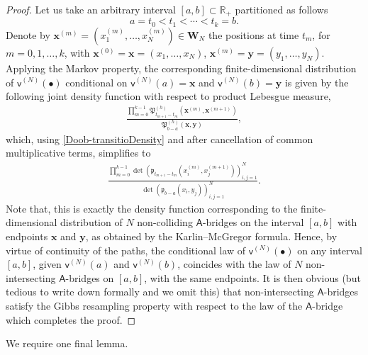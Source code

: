\documentclass[]{article}
\begin{document}
\begin{proof}
    Let us take an arbitrary
    interval $[a,b]\subset\mathbb{R}_+$ partitioned as follows
\begin{equation*}
   a= t_0< t_1< \cdots< t_k= b.
\end{equation*}
Denote by $\mathbf{x}^{(m)} = (x_1^{(m)}, \dots, x_N^{(m)})\in\mathbf{W}_{N}$ the positions
at time $t_m$, for $m=0, 1, \dots,k$,
with
$\mathbf{x}^{(0)} = \mathbf{x}=
\left(x_1, \dots, x_N\right)$, $\mathbf{x}^{(m)} = \mathbf{y}
=\left(y_1, \dots, y_N\right)$. Applying the Markov property, the corresponding finite-dimensional distribution of 
$\mathsf{v}^{(N)}(\bullet)$ conditional on $\mathsf{v}^{(N)}(a)=\mathbf{x}$ and $\mathsf{v}^{(N)}(b)=\mathbf{y}$
is given by the following joint density function with respect to product Lebesgue measure,
\begin{align*}
\frac{
\prod_{m=0}^{k-1} \mathfrak{P}^{(h)}_{t_{m+1} - t_m}\left(\mathbf{x}^{(m)}, \mathbf{x}^{(m+1)}\right)
}{
\mathfrak{P}^{(h)}_{b-a}\left(\mathbf{x}, \mathbf{y}\right)
}, 
\end{align*}
which, using \eqref{Doob-transitioDensity} and after  cancellation of common multiplicative terms, simplifies to
\begin{align}
\frac{
\prod_{m=0}^{k-1} \det\left(\mathfrak{p}_{t_{m+1}-t_m}\left(x_i^{(m)},x_j^{(m+1)}\right)\right)_{i,j=1}^{N}}{
\det\left(\mathfrak{p}_{b-a}(x_i,y_j)\right)_{i,j=1}^{N}
}.
\end{align}
Note that, this is exactly the density function corresponding to the finite-dimensional distribution of $N$ non-colliding
$\mathsf{A}$-bridges
on the interval $[a,b]$ with endpoints $\mathbf{x}$ and $ \mathbf{y}$, as obtained by the Karlin–McGregor formula.
Hence, by virtue of continuity of the paths, the conditional law of $\mathsf{v}^{(N)}(\bullet)$ on any interval $[a,b]$, given $\mathsf{v}^{(N)}(a)$ and $\mathsf{v}^{(N)}(b)$, coincides with the law of $N$ non-intersecting $\mathsf{A}$-bridges on $[a,b]$, with the same endpoints. It is then obvious (but tedious to write down formally and we omit this) that non-intersecting $\mathsf{A}$-bridges satisfy the Gibbs resampling property with respect to the law of the $\mathsf{A}$-bridge which completes the proof.
\end{proof}

We require one final lemma.
\end{document}
